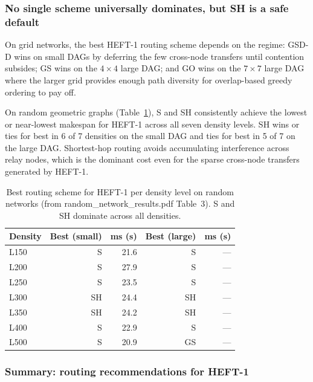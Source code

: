 \documentclass[11pt]{article}
\begin{document}
\subsubsection{No single scheme universally dominates, but SH is a safe default}

On grid networks, the best HEFT-1 routing scheme depends on the regime:
GSD-D wins on small DAGs by deferring the few cross-node transfers until
contention subsides; GS wins on the $4\times4$ large DAG; and GO wins on the
$7\times7$ large DAG where the larger grid provides enough path diversity for
overlap-based greedy ordering to pay off.

On random geometric graphs (Table~\ref{tab:routing-h1-rand}), S and SH
consistently achieve the lowest or near-lowest makespan for HEFT-1 across all
seven density levels.  SH wins or ties for best in 6 of 7 densities on the
small DAG and ties for best in 5 of 7 on the large DAG.  Shortest-hop routing
avoids accumulating interference across relay nodes, which is the dominant
cost even for the sparse cross-node transfers generated by HEFT-1.

\begin{table}[H]
\centering
\small
\begin{tabular}{l r r r r}
\toprule
\textbf{Density} & \textbf{Best (small)} & \textbf{ms (s)} & \textbf{Best (large)} & \textbf{ms (s)} \\
\midrule
L150 & S   & 21.6 & S   & --- \\
L200 & S   & 27.9 & S   & --- \\
L250 & S   & 23.5 & S   & --- \\
L300 & SH  & 24.4 & SH  & --- \\
L350 & SH  & 24.2 & SH  & --- \\
L400 & S   & 22.9 & S   & --- \\
L500 & S   & 20.9 & GS  & --- \\
\bottomrule
\end{tabular}
\caption{Best routing scheme for HEFT-1 per density level on random networks
(from random\_network\_results.pdf Table~3).  S and SH dominate across all
densities.}
\label{tab:routing-h1-rand}
\end{table}

\subsubsection{Summary: routing recommendations for HEFT-1}
\end{document}
